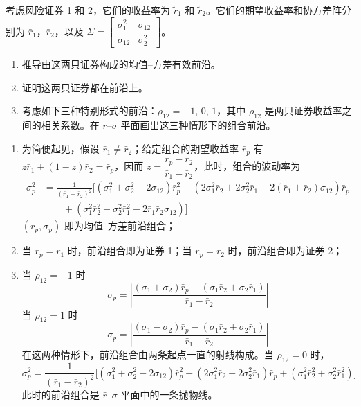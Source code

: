 \begin{problem}
 考虑风险证券 1 和 2，它们的收益率为 $\tilde{r}_{1}$ 和 $\tilde{r}_{2}$。它们的期望收益率和协方差阵分别为 $\bar{r}_{1}$，$\bar{r}_{2}$，以及 $\Sigma=\begin{bmatrix}\sigma_{1}^{2} & \sigma_{12} \\ \sigma_{12} & \sigma_{2}^{2}\end{bmatrix}$。
\begin{enumerate}[label=(\alph*)]
    \item 推导由这两只证券构成的均值--方差有效前沿。
    \item 证明这两只证券都在前沿上。
    \item 考虑如下三种特别形式的前沿：$\rho_{12}=-1,\,0,\,1$，其中 $\rho_{12}$ 是两只证券收益率之间的相关系数。在 $\bar{r}$--$\sigma$ 平面画出这三种情形下的组合前沿。
\end{enumerate}
\end{problem}
\begin{solution}
\begin{enumerate}[label=(\alph*)]
    \item 为简便起见，假设 $\bar{r}_{1}\ne\bar{r}_{2}$；给定组合的期望收益率 $\bar{r}_{p}$ 有 $z\bar{r}_{1}+(1-z)\bar{r}_{2}=\bar{r}_{p}$，因而 $z=\dfrac{\bar{r}_{p}-\bar{r}_{2}}{\bar{r}_{1}-\bar{r}_{2}}$，此时，组合的波动率为
    \[
        \begin{aligned}
            \sigma_{p}^{2}&=\frac{1}{(\bar{r}_{1}-\bar{r}_{2})^{2}}\bigl[(\sigma_{1}^{2}+\sigma_{2}^{2}-2\sigma_{12})\bar{r}_{p}^{2}-(2\sigma_{1}^{2}\bar{r}_{2}+2\sigma_{2}^{2}\bar{r}_{1}-2(\bar{r}_{1}+\bar{r}_{2})\sigma_{12})\bar{r}_{p}\\
            &\qquad+(\sigma_{1}^{2}\bar{r}_{2}^{2}+\sigma_{2}^{2}\bar{r}_{1}^{2}-2\bar{r}_{1}\bar{r}_{2}\sigma_{12})\bigr]
        \end{aligned}
    \]
    $(\bar{r}_{p},\sigma_{p})$ 即为均值--方差前沿组合；
    \item 当 $\bar{r}_{p}=\bar{r}_{1}$ 时，前沿组合即为证券 1；当 $\bar{r}_{p}=\bar{r}_{2}$ 时，前沿组合即为证券 2；
    \item 当 $\rho_{12}=-1$ 时
    \[
        \sigma_{p}=\left|\frac{(\sigma_{1}+\sigma_{2})\bar{r}_{p}-(\sigma_{1}\bar{r}_{2}+\sigma_{2}\bar{r}_{1})}{\bar{r}_{1}-\bar{r}_{2}}\right|
    \]
    当 $\rho_{12}=1$ 时
    \[
        \sigma_{p}=\left|\frac{(\sigma_{1}-\sigma_{2})\bar{r}_{p}-(\sigma_{1}\bar{r}_{2}+\sigma_{2}\bar{r}_{1})}{\bar{r}_{1}-\bar{r}_{2}}\right|
    \]
    在这两种情形下，前沿组合由两条起点一直的射线构成。当 $\rho_{12}=0$ 时，
    \[
        \sigma_{p}^{2}=\frac{1}{(\bar{r}_{1}-\bar{r}_{2})^{2}}\bigl[(\sigma_{1}^{2}+\sigma_{2}^{2}-2\sigma_{12})\bar{r}_{p}^{2}-(2\sigma_{1}^{2}\bar{r}_{2}+2\sigma_{2}^{2}\bar{r}_{1})\bar{r}_{p}+(\sigma_{1}^{2}\bar{r}_{2}^{2}+\sigma_{2}^{2}\bar{r}_{1}^{2})\bigr]
    \]
    此时的前沿组合是 $\bar{r}$--$\sigma$ 平面中的一条抛物线。
\end{enumerate}
\end{solution}


